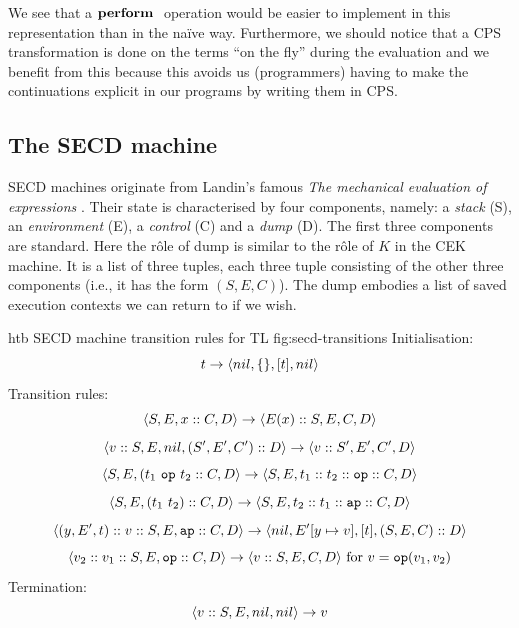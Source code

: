 \documentclass[class=article, crop=false]{standalone}
\begin{document}
We see that a $\mathbf{perform}\ $ operation would be easier to implement in this
representation than in the naïve way. Furthermore, we should notice that a CPS
transformation is done on the terms ``on the fly'' during the evaluation and we
benefit from this because this avoids us (programmers) having to make the
continuations explicit in our programs by writing them in CPS.

\subsection{The SECD machine}

SECD machines originate from Landin's famous
\emph{The mechanical evaluation of expressions} \cite{landin-secd}. Their state
is characterised by four components, namely: a \emph{stack} (S),
an \emph{environment} (E), a \emph{control} (C) and a \emph{dump} (D). The first
three components are standard. Here the rôle of dump is similar to the rôle of
$K$ in the CEK machine. It is a list of three tuples, each three tuple consisting
of the other three components (i.e., it has the form $(S, E, C)$). The dump
embodies a list of saved execution contexts we can return to if we wish.

\begin{myfigure}[.8]{htb}
{SECD machine transition rules for TL}
{fig:secd-transitions}
\small
Initialisation:
$$ t \to \langle nil, \{\}, [t], nil \rangle $$
%
Transition rules:
$$ \langle S, E, x :: C, D \rangle \to \langle E(x) :: S, E, C, D \rangle $$
$$ \langle v :: S, E, nil, (S', E', C') :: D \rangle \to \langle v :: S', E', C', D \rangle $$
$$ \langle S, E, (t_1\ \mathtt{op}\ t_2 :: C, D \rangle \to \langle S, E, t_1 :: t_2 :: \mathtt{op} :: C, D \rangle $$
$$ \langle S, E, (t_1\ t_2) :: C, D \rangle \to \langle S, E, t_2 :: t_1 :: \mathtt{ap} :: C, D \rangle $$
$$ \langle (y, E', t) :: v :: S, E, \mathtt{ap} :: C, D \rangle \to \langle nil, E'[y \mapsto v], [t], (S, E, C) :: D \rangle $$
$$ \langle v_2 :: v_1 :: S, E, \mathtt{op} :: C, D \rangle \to \langle v :: S, E, C, D \rangle \text{ for } v = \mathtt{op}(v_1, v_2) $$
%
Termination:
$$ \langle v :: S, E, nil, nil \rangle \to v $$
\end{myfigure}
\end{document}

